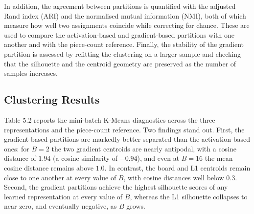 In addition, the agreement between partitions is quantified with the adjusted Rand index (ARI) and the normalised mutual information (NMI), both of which measure how well two assignments coincide while correcting for chance. These are used to compare the activation-based and gradient-based partitions with one another and with the piece-count reference. Finally, the stability of the gradient partition is assessed by refitting the clustering on a larger sample and checking that the silhouette and the centroid geometry are preserved as the number of samples increases.

\subsection{Clustering Results}

Table 5.2 reports the mini-batch K-Means diagnostics across the three representations and the piece-count reference. Two findings stand out. First, the gradient-based partitions are markedly better separated than the activation-based ones: for $B=2$ the two gradient centroids are nearly antipodal, with a cosine distance of $1.94$ (a cosine similarity of $-0.94$), and even at $B=16$ the mean cosine distance remains above $1.0$. In contrast, the board and L1 centroids remain close to one another at every value of $B$, with cosine distances well below $0.3$. Second, the gradient partitions achieve the highest silhouette scores of any learned representation at every value of $B$, whereas the L1 silhouette collapses to near zero, and eventually negative, as $B$ grows.

